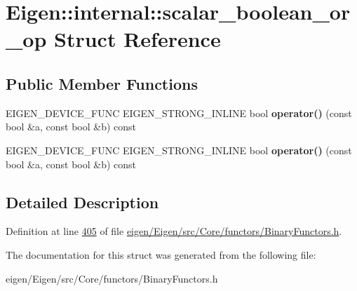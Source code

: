 \hypertarget{struct_eigen_1_1internal_1_1scalar__boolean__or__op}{}\section{Eigen\+:\+:internal\+:\+:scalar\+\_\+boolean\+\_\+or\+\_\+op Struct Reference}
\label{struct_eigen_1_1internal_1_1scalar__boolean__or__op}
\subsection*{Public Member Functions}
\begin{DoxyCompactItemize}
\item 
\mbox{\label{struct_eigen_1_1internal_1_1scalar__boolean__or__op_a594e2cc10b323134a627b40f534ca24e}} 
E\+I\+G\+E\+N\+\_\+\+D\+E\+V\+I\+C\+E\+\_\+\+F\+U\+NC E\+I\+G\+E\+N\+\_\+\+S\+T\+R\+O\+N\+G\+\_\+\+I\+N\+L\+I\+NE bool {\bfseries operator()} (const bool \&a, const bool \&b) const
\item 
\mbox{\label{struct_eigen_1_1internal_1_1scalar__boolean__or__op_a594e2cc10b323134a627b40f534ca24e}} 
E\+I\+G\+E\+N\+\_\+\+D\+E\+V\+I\+C\+E\+\_\+\+F\+U\+NC E\+I\+G\+E\+N\+\_\+\+S\+T\+R\+O\+N\+G\+\_\+\+I\+N\+L\+I\+NE bool {\bfseries operator()} (const bool \&a, const bool \&b) const
\end{DoxyCompactItemize}


\subsection{Detailed Description}


Definition at line \hyperlink{eigen_2_eigen_2src_2_core_2functors_2_binary_functors_8h_source_l00405}{405} of file \hyperlink{eigen_2_eigen_2src_2_core_2functors_2_binary_functors_8h_source}{eigen/\+Eigen/src/\+Core/functors/\+Binary\+Functors.\+h}.



The documentation for this struct was generated from the following file\+:\begin{DoxyCompactItemize}
\item 
eigen/\+Eigen/src/\+Core/functors/\+Binary\+Functors.\+h\end{DoxyCompactItemize}
